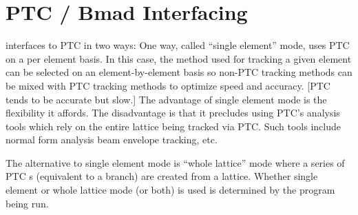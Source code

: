 \section{PTC / Bmad Interfacing}
\label{s:ptc.interface}

\bmad interfaces to PTC in two ways: One way, called ``single element'' mode, uses PTC on a per
element basis. In this case, the method used for tracking a given element can be selected on an
element-by-element basis so non-PTC tracking methods can be mixed with PTC tracking methods to
optimize speed and accuracy. [PTC tends to be accurate but slow.] The advantage of single element
mode is the flexibility it affords. The disadvantage is that it precludes using PTC's analysis tools
which rely on the entire lattice being tracked via PTC. Such tools include normal form analysis beam
envelope tracking, etc.

The alternative to single element mode is ``whole lattice'' mode where a series of PTC s
(equivalent to a \bmad branch) are created from a \bmad lattice. Whether single element or whole
lattice mode (or both) is used is determined by the program being run.

